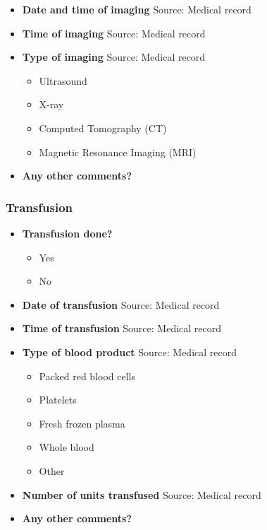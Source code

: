 \documentclass[
]{scrartcl}
\providecommand{\tightlist}{%
  \setlength{\itemsep}{0pt}\setlength{\parskip}{0pt}}\usepackage{longtable,booktabs,array}
\begin{document}
\begin{itemize}
\item
  \textbf{Date and time of imaging} Source: Medical record
\item
  \textbf{Time of imaging} Source: Medical record
\item
  \textbf{Type of imaging} Source: Medical record

  \begin{itemize}
  \tightlist
  \item
    Ultrasound
  \item
    X-ray
  \item
    Computed Tomography (CT)
  \item
    Magnetic Resonance Imaging (MRI)
  \end{itemize}
\item
  \textbf{Any other comments?}
\end{itemize}

\subsubsection{Transfusion}\label{transfusion}

\begin{itemize}
\item
  \textbf{Transfusion done?}

  \begin{itemize}
  \tightlist
  \item
    Yes
  \item
    No
  \end{itemize}
\item
  \textbf{Date of transfusion} Source: Medical record
\item
  \textbf{Time of transfusion} Source: Medical record
\item
  \textbf{Type of blood product} Source: Medical record

  \begin{itemize}
  \tightlist
  \item
    Packed red blood cells
  \item
    Platelets
  \item
    Fresh frozen plasma
  \item
    Whole blood
  \item
    Other
  \end{itemize}
\item
  \textbf{Number of units transfused} Source: Medical record
\item
  \textbf{Any other comments?}
\end{itemize}
\end{document}
